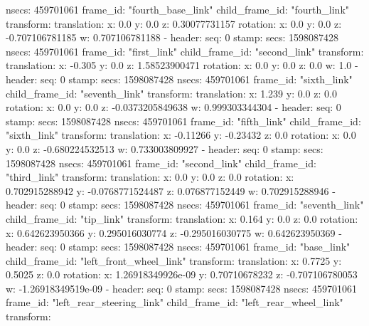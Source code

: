         nsecs: 459701061
      frame_id: "fourth_base_link"
    child_frame_id: "fourth_link"
    transform: 
      translation: 
        x: 0.0
        y: 0.0
        z: 0.30077731157
      rotation: 
        x: 0.0
        y: 0.0
        z: -0.707106781185
        w: 0.707106781188
  - 
    header: 
      seq: 0
      stamp: 
        secs: 1598087428
        nsecs: 459701061
      frame_id: "first_link"
    child_frame_id: "second_link"
    transform: 
      translation: 
        x: -0.305
        y: 0.0
        z: 1.58523900471
      rotation: 
        x: 0.0
        y: 0.0
        z: 0.0
        w: 1.0
  - 
    header: 
      seq: 0
      stamp: 
        secs: 1598087428
        nsecs: 459701061
      frame_id: "sixth_link"
    child_frame_id: "seventh_link"
    transform: 
      translation: 
        x: 1.239
        y: 0.0
        z: 0.0
      rotation: 
        x: 0.0
        y: 0.0
        z: -0.0373205849638
        w: 0.999303344304
  - 
    header: 
      seq: 0
      stamp: 
        secs: 1598087428
        nsecs: 459701061
      frame_id: "fifth_link"
    child_frame_id: "sixth_link"
    transform: 
      translation: 
        x: -0.11266
        y: -0.23432
        z: 0.0
      rotation: 
        x: 0.0
        y: 0.0
        z: -0.680224532513
        w: 0.733003809927
  - 
    header: 
      seq: 0
      stamp: 
        secs: 1598087428
        nsecs: 459701061
      frame_id: "second_link"
    child_frame_id: "third_link"
    transform: 
      translation: 
        x: 0.0
        y: 0.0
        z: 0.0
      rotation: 
        x: 0.702915288942
        y: -0.0768771524487
        z: 0.076877152449
        w: 0.702915288946
  - 
    header: 
      seq: 0
      stamp: 
        secs: 1598087428
        nsecs: 459701061
      frame_id: "seventh_link"
    child_frame_id: "tip_link"
    transform: 
      translation: 
        x: 0.164
        y: 0.0
        z: 0.0
      rotation: 
        x: 0.642623950366
        y: 0.295016030774
        z: -0.295016030775
        w: 0.642623950369
  - 
    header: 
      seq: 0
      stamp: 
        secs: 1598087428
        nsecs: 459701061
      frame_id: "base_link"
    child_frame_id: "left_front_wheel_link"
    transform: 
      translation: 
        x: 0.7725
        y: 0.5025
        z: 0.0
      rotation: 
        x: 1.26918349926e-09
        y: 0.70710678232
        z: -0.707106780053
        w: -1.26918349519e-09
  - 
    header: 
      seq: 0
      stamp: 
        secs: 1598087428
        nsecs: 459701061
      frame_id: "left_rear_steering_link"
    child_frame_id: "left_rear_wheel_link"
    transform: 
